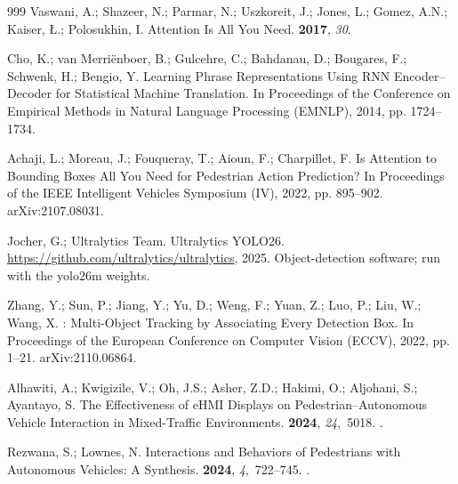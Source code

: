 \documentclass[mti,article,submit,moreauthors]{Definitions/mdpi}
\begin{document}
\begin{thebibliography}{999}
Vaswani, A.; Shazeer, N.; Parmar, N.; Uszkoreit, J.; Jones, L.; Gomez, A.N.;
  Kaiser, {\L}.; Polosukhin, I.
\newblock Attention Is All You Need.
  {\bf 2017}, {\em 30}.

Cho, K.; van Merri{\"e}nboer, B.; Gulcehre, C.; Bahdanau, D.; Bougares, F.;
  Schwenk, H.; Bengio, Y.
\newblock Learning Phrase Representations Using {RNN} Encoder--Decoder for
  Statistical Machine Translation.
\newblock In Proceedings of the Conference on Empirical Methods in Natural
  Language Processing (EMNLP),  2014, pp. 1724--1734.

Achaji, L.; Moreau, J.; Fouqueray, T.; Aioun, F.; Charpillet, F.
\newblock Is Attention to Bounding Boxes All You Need for Pedestrian Action
  Prediction?
\newblock In Proceedings of the IEEE Intelligent Vehicles Symposium (IV),
  2022, pp. 895--902.
\newblock arXiv:2107.08031.

Jocher, G.; {Ultralytics Team}.
\newblock Ultralytics {YOLO26}.
\newblock \url{https://github.com/ultralytics/ultralytics},  2025.
\newblock Object-detection software; run with the yolo26m weights.

Zhang, Y.; Sun, P.; Jiang, Y.; Yu, D.; Weng, F.; Yuan, Z.; Luo, P.; Liu, W.;
  Wang, X.
: Multi-Object Tracking by Associating Every Detection
  Box.
\newblock In Proceedings of the European Conference on Computer Vision (ECCV),
  2022, pp. 1--21.
\newblock arXiv:2110.06864.

Alhawiti, A.; Kwigizile, V.; Oh, J.S.; Asher, Z.D.; Hakimi, O.; Aljohani, S.;
  Ayantayo, S.
\newblock The Effectiveness of {eHMI} Displays on Pedestrian--Autonomous
  Vehicle Interaction in Mixed-Traffic Environments.
 {\bf 2024}, {\em 24},~5018.
.

Rezwana, S.; Lownes, N.
\newblock Interactions and Behaviors of Pedestrians with Autonomous Vehicles: A
  Synthesis.
 {\bf 2024}, {\em 4},~722--745.
.


\end{thebibliography}
\end{document}
